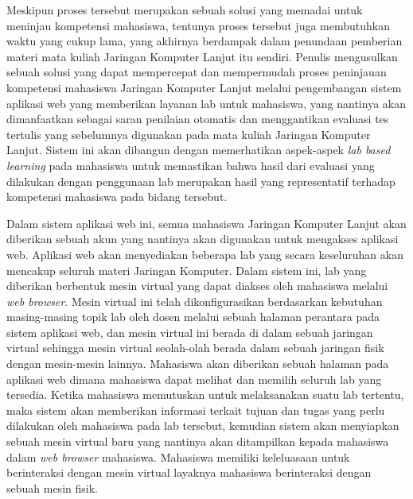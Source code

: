 Meskipun proses tersebut merupakan sebuah solusi yang memadai untuk meninjau kompetensi mahasiswa, tentunya proses tersebut juga membutuhkan waktu yang cukup lama,
yang akhirnya berdampak dalam penundaan pemberian materi mata kuliah Jaringan Komputer Lanjut itu sendiri. Penulis mengusulkan sebuah solusi yang dapat mempercepat
dan mempermudah proses peninjauan kompetensi mahasiswa Jaringan Komputer Lanjut melalui pengembangan sistem aplikasi web yang memberikan layanan lab
untuk mahasiswa, yang nantinya akan dimanfaatkan sebagai saran penilaian otomatis dan menggantikan evaluasi tes tertulis yang sebelumnya digunakan pada mata kuliah Jaringan Komputer Lanjut.
Sistem ini akan dibangun dengan memerhatikan aspek-aspek \textit{lab based learning} pada mahasiswa untuk memastikan bahwa hasil dari evaluasi yang dilakukan dengan penggunaan
lab merupakan hasil yang representatif terhadap kompetensi mahasiswa pada bidang tersebut.
\par

Dalam sistem aplikasi web ini, semua mahasiswa Jaringan Komputer Lanjut akan diberikan sebuah akun yang nantinya akan digunakan untuk mengakses aplikasi web.
Aplikasi web akan menyediakan beberapa lab yang secara keseluruhan akan mencakup seluruh materi Jaringan Komputer. Dalam sistem ini, lab yang diberikan berbentuk
mesin virtual yang dapat diakses oleh mahasiswa melalui \textit{web browser}. Mesin virtual ini telah dikonfigurasikan berdasarkan kebutuhan masing-masing topik lab
oleh dosen melalui sebuah halaman perantara pada sistem aplikasi web, dan mesin virtual ini berada di dalam sebuah jaringan virtual sehingga mesin virtual
seolah-olah berada dalam sebuah jaringan fisik dengan mesin-mesin lainnya. Mahasiswa akan diberikan sebuah halaman pada aplikasi web dimana mahasiswa dapat melihat
dan memilih seluruh lab yang tersedia. Ketika mahasiswa memutuskan untuk melaksanakan suatu lab tertentu, maka sistem akan memberikan informasi terkait tujuan dan
tugas yang perlu dilakukan oleh mahasiswa pada lab tersebut, kemudian sistem akan menyiapkan sebuah mesin virtual baru yang nantinya akan ditampilkan kepada
mahasiswa dalam \textit{web browser} mahasiswa. Mahasiswa memiliki keleluasaan untuk berinteraksi dengan mesin virtual layaknya mahasiswa berinteraksi dengan sebuah mesin fisik. 
\par

